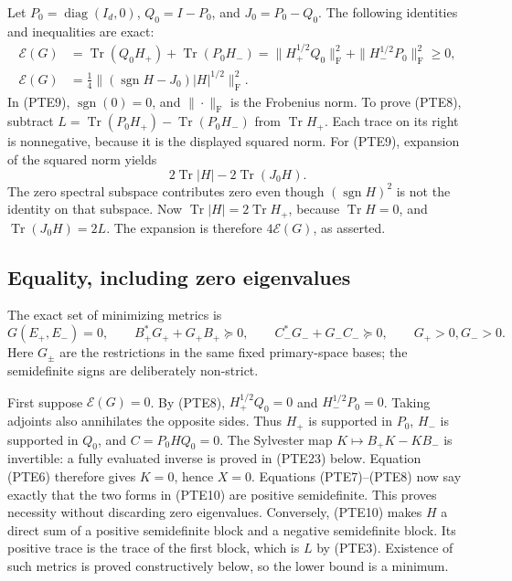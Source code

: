 Let \(P_0=\operatorname{diag}(I_d,0)\), \(Q_0=I-P_0\), and
\(J_0=P_0-Q_0\).  The following identities and inequalities are exact:
\begin{align}
 \mathcal E(G)
 &=\operatorname{Tr}(Q_0H_+)+\operatorname{Tr}(P_0H_-)
 =\|H_+^{1/2}Q_0\|_{\mathrm F}^2
   +\|H_-^{1/2}P_0\|_{\mathrm F}^2\geq0,
 \tag{PTE8}\label{eq:pte8}\\
 \mathcal E(G)
 &=\frac14\| (\operatorname{sgn}H-J_0)|H|^{1/2}\|_{\mathrm F}^2.
 \tag{PTE9}\label{eq:pte9}
\end{align}
In (PTE9), \(\operatorname{sgn}(0)=0\), and \(\|\cdot\|_{\mathrm F}\)
is the Frobenius norm.  To prove (PTE8), subtract
\(L=\operatorname{Tr}(P_0H_+)-\operatorname{Tr}(P_0H_-)\) from
\(\operatorname{Tr}H_+\).  Each trace on its right is nonnegative, because
it is the displayed squared norm.  For (PTE9), expansion of the squared
norm yields
\[
 2\operatorname{Tr}|H|-2\operatorname{Tr}(J_0H).
\]
The zero spectral subspace contributes zero even though
\((\operatorname{sgn}H)^2\) is not the identity on that subspace.
Now \(\operatorname{Tr}|H|=2\operatorname{Tr}H_+\), because
\(\operatorname{Tr}H=0\), and \(\operatorname{Tr}(J_0H)=2L\).
The expansion is therefore \(4\mathcal E(G)\), as asserted.

\subsection{Equality, including zero eigenvalues}

The exact set of minimizing metrics is
\begin{equation}\tag{PTE10}\label{eq:pte10}
 G(E_+,E_-)=0,
 \qquad B_+^*G_++G_+B_+\succeq0,
 \qquad C_-^*G_-+G_-C_-\succeq0,
 \qquad G_+>0, G_->0.
\end{equation}
Here \(G_\pm\) are the restrictions in the same fixed primary-space
bases; the semidefinite signs are deliberately non-strict.

First suppose \(\mathcal E(G)=0\).  By (PTE8),
\(H_+^{1/2}Q_0=0\) and \(H_-^{1/2}P_0=0\).  Taking adjoints also
annihilates the opposite sides.  Thus \(H_+\) is supported in \(P_0\),
\(H_-\) is supported in \(Q_0\), and
\(C=P_0HQ_0=0\).  The Sylvester map
\(K\mapsto B_+K-KB_-\) is invertible: a fully evaluated inverse is
proved in (PTE23) below.  Equation (PTE6) therefore gives \(K=0\), hence
\(X=0\).  Equations (PTE7)--(PTE8) now say exactly that the two forms in
(PTE10) are positive semidefinite.  This proves necessity without
discarding zero eigenvalues.  Conversely, (PTE10) makes \(H\) a direct
sum of a positive semidefinite block and a negative semidefinite block.
Its positive trace is the trace of the first block, which is \(L\) by
(PTE3).  Existence of such metrics is proved constructively below, so
the lower bound is a minimum.

